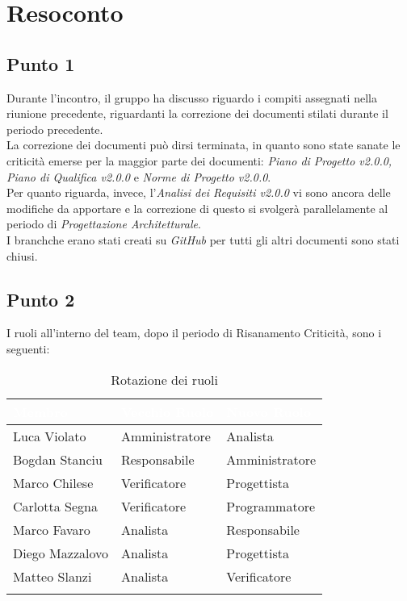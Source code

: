 \section{Resoconto}

\subsection{Punto 1}
Durante l'incontro, il gruppo ha discusso riguardo i compiti assegnati nella riunione precedente, riguardanti la correzione dei documenti stilati durante il periodo precedente. \\
La correzione dei documenti può dirsi terminata, in quanto sono state sanate le criticità emerse per la maggior parte dei documenti: \textit{Piano di Progetto v2.0.0, Piano di Qualifica v2.0.0} e \textit{Norme di Progetto v2.0.0}. \\
Per quanto riguarda, invece, l'\textit{Analisi dei Requisiti v2.0.0} vi sono ancora delle modifiche da apportare e la correzione di questo si svolgerà parallelamente al periodo di \textit{Progettazione Architetturale}. \\
I branch\glossario che erano stati creati su \textit{GitHub\glossario} per tutti gli altri documenti sono stati chiusi. \\


\subsection{Punto 2}
I ruoli all'interno del team, dopo il periodo di Risanamento Criticità, sono i seguenti:\\

\begin{center}
\begin{longtable}[c]{|m{}|m{}|m{}|} 
\hline
\rowcolor{bluelogo}\textbf{\textcolor{white}{Membro}} & \textbf{\textcolor{white}{Vecchio Ruolo}} & \textbf{\textcolor{white}{Nuovo Ruolo}}\\
\hline
\hline
Luca Violato & Amministratore & Analista \\
\hline
\rowcolor{grigio}Bogdan Stanciu & Responsabile & Amministratore \\
\hline
Marco Chilese & Verificatore & Progettista\\
\hline
\rowcolor{grigio}Carlotta Segna & Verificatore & Programmatore\\
\hline
Marco Favaro & Analista & Responsabile \\
\hline
\rowcolor{grigio} Diego Mazzalovo & Analista & Progettista\\
\hline
Matteo Slanzi & Analista & Verificatore\\
\hline
\caption{Rotazione dei ruoli}
\end{longtable}
\end{center}

